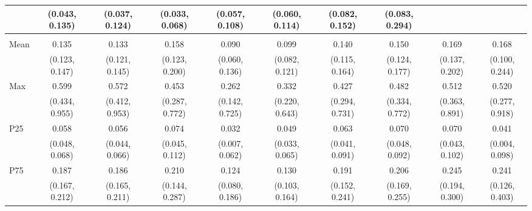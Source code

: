 {\begin{tabular}{l|c|c|c|c|c|c|c|c|c}
& {\scriptsize (0.043, 0.135)}
& {\scriptsize (0.037, 0.124)}
& {\scriptsize (0.033, 0.068)}
& {\scriptsize (0.057, 0.108)}
& {\scriptsize (0.060, 0.114)}
& {\scriptsize (0.082, 0.152)}
& {\scriptsize (0.083, 0.294)}
\\ [0.1cm]
\hline
\noalign{\smallskip}
\multicolumn{10}{l}{\textbf{Effect with Leads and Lags}} \\
\noalign{\smallskip}
\hline
Mean
& 0.135 & 0.133 & 0.158 & 0.090 & 0.099 & 0.140 & 0.150 & 0.169 & 0.168 \\
& {\scriptsize (0.123, 0.147)}
& {\scriptsize (0.121, 0.145)}
& {\scriptsize (0.123, 0.200)}
& {\scriptsize (0.060, 0.136)}
& {\scriptsize (0.082, 0.121)}
& {\scriptsize (0.115, 0.164)}
& {\scriptsize (0.124, 0.177)}
& {\scriptsize (0.137, 0.202)}
& {\scriptsize (0.100, 0.244)}
\\ [0.1cm]
\hline
Max
& 0.599 & 0.572 & 0.453 & 0.262 & 0.332 & 0.427 & 0.482 & 0.512 & 0.520 \\
& {\scriptsize (0.434, 0.955)}
& {\scriptsize (0.412, 0.953)}
& {\scriptsize (0.287, 0.772)}
& {\scriptsize (0.142, 0.725)}
& {\scriptsize (0.220, 0.643)}
& {\scriptsize (0.294, 0.731)}
& {\scriptsize (0.334, 0.772)}
& {\scriptsize (0.363, 0.891)}
& {\scriptsize (0.277, 0.918)}
\\ [0.1cm]
\hline
P25
& 0.058 & 0.056 & 0.074 & 0.032 & 0.049 & 0.063 & 0.070 & 0.070 & 0.041 \\
& {\scriptsize (0.048, 0.068)}
& {\scriptsize (0.044, 0.066)}
& {\scriptsize (0.045, 0.112)}
& {\scriptsize (0.007, 0.062)}
& {\scriptsize (0.033, 0.065)}
& {\scriptsize (0.041, 0.091)}
& {\scriptsize (0.048, 0.092)}
& {\scriptsize (0.043, 0.102)}
& {\scriptsize (0.004, 0.098)}
\\ [0.1cm]
\hline
P75
& 0.187 & 0.186 & 0.210 & 0.124 & 0.130 & 0.191 & 0.206 & 0.245 & 0.241 \\
& {\scriptsize (0.167, 0.212)}
& {\scriptsize (0.165, 0.211)}
& {\scriptsize (0.144, 0.287)}
& {\scriptsize (0.080, 0.186)}
& {\scriptsize (0.103, 0.164)}
& {\scriptsize (0.152, 0.241)}
& {\scriptsize (0.169, 0.255)}
& {\scriptsize (0.194, 0.300)}
& {\scriptsize (0.126, 0.403)}
\\ [0.1cm]
\hline
\hline
\end{tabular}
}
